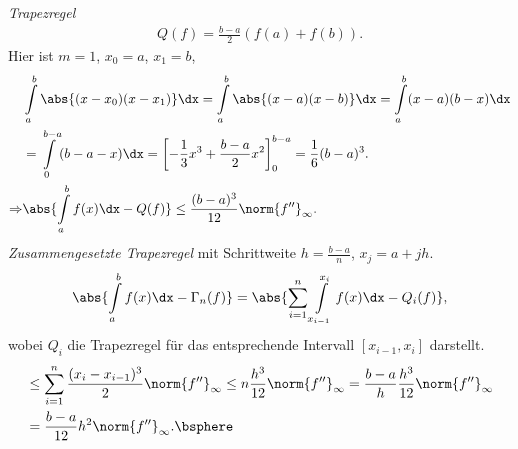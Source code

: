 \begin{bspn}
\textit{Trapezregel}
\begin{align*}
Q(f) = \frac{b-a}{2}\left(f(a) + f(b) \right).
\end{align*}
Hier ist $m=1$, $x_0=a$, $x_1=b$,
\begin{align*}
&\int\limits_a^b \abs{(x-x_0)(x-x_1)}\dx = \int\limits_a^b \abs{(x-a)(x-b)}\dx
= \int\limits_a^b (x-a)(b-x)\dx \\ 
&= \int\limits_0^{b-a} (b-a-x)\dx = 
\left[-\frac{1}{3}x^3 + \frac{b-a}{2}x^2 \right]_0^{b-a} = \frac{1}{6}(b-a)^3.\\
\Rightarrow & \abs{\int\limits_a^b f(x)\dx - Q(f)} \le
\frac{(b-a)^3}{12}\norm{f''}_\infty.
\end{align*}
\textit{Zusammengesetzte Trapezregel} mit Schrittweite $h=\frac{b-a}{n}$,
$x_j=a+j h$.
\begin{align*}
\abs{\int\limits_a^b f(x)\dx-\Gamma_n(f)} = \abs{\sum\limits_{i=1}^n
\int\limits_{x_{i-1}}^{x_i}f(x)\dx - Q_i(f)},
\end{align*}
wobei $Q_i$ die Trapezregel für das entsprechende Intervall $[x_{i-1},x_i]$
darstellt.
\begin{align*}
&\le \sum\limits_{i=1}^n \frac{(x_i-x_{i-1})^3}{2}\norm{f''}_\infty \le
n\frac{h^3}{12}\norm{f''}_\infty = \frac{b-a}{h}\frac{h^3}{12}\norm{f''}_\infty
\\ &= \frac{b-a}{12}h^2\norm{f''}_\infty.\bsphere
\end{align*}
\end{bspn}
